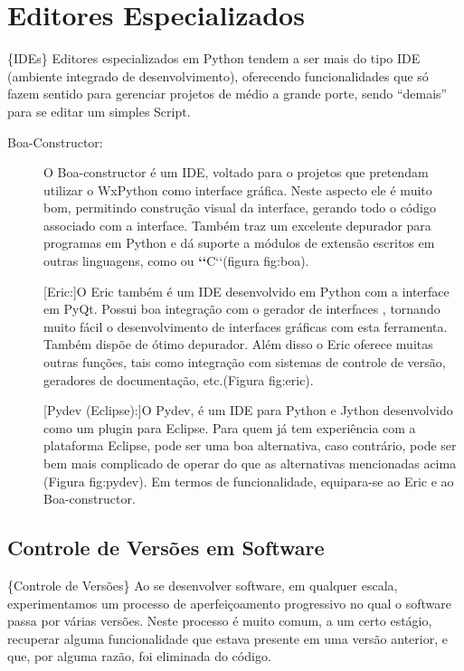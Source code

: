 \documentclass[a4paper,10pt,portuguese]{sphinxmanual}
\begin{document}
\chapter{Editores Especializados}
\label{capferr:editores-especializados}
\{IDEs\} Editores especializados em Python tendem a ser mais do tipo
IDE (ambiente integrado de desenvolvimento), oferecendo
funcionalidades que só fazem sentido para gerenciar projetos de
médio a grande porte, sendo ``demais'' para se editar um simples
Script.
\begin{description}
\item[{Boa-Constructor:}] \leavevmode
O Boa-constructor é um IDE, voltado para o projetos que pretendam
utilizar o WxPython como interface gráfica. Neste aspecto ele é
muito bom, permitindo construção visual da interface, gerando todo
o código associado com a interface. Também traz um excelente
depurador para programas em Python e dá suporte a módulos de
extensão escritos em outras linguagens, como  ou
{\color{red}\bfseries{}{}`{}`}C{}`{}`(figura fig:boa).

{[}Eric:{]}O Eric também é um IDE desenvolvido em Python com a
interface em PyQt. Possui boa integração com o gerador de
interfaces , tornando muito fácil o desenvolvimento
de interfaces gráficas com esta ferramenta. Também dispõe de ótimo
depurador. Além disso o Eric oferece muitas outras funções, tais
como integração com sistemas de controle de versão, geradores de
documentação, etc.(Figura fig:eric).

{[}Pydev (Eclipse):{]}O Pydev, é um IDE para Python e Jython
desenvolvido como um plugin para Eclipse. Para quem já tem
experiência com a plataforma Eclipse, pode ser uma boa alternativa,
caso contrário, pode ser bem mais complicado de operar do que as
alternativas mencionadas acima (Figura fig:pydev). Em termos de
funcionalidade, equipara-se ao Eric e ao Boa-constructor.

\end{description}


\section{Controle de Versões em Software}
\label{capferr:controle-de-versoes-em-software}
\{Controle de Versões\} Ao se desenvolver software, em qualquer
escala, experimentamos um processo de aperfeiçoamento progressivo
no qual o software passa por várias versões. Neste processo é muito
comum, a um certo estágio, recuperar alguma funcionalidade que
estava presente em uma versão anterior, e que, por alguma razão,
foi eliminada do código.
\end{document}
